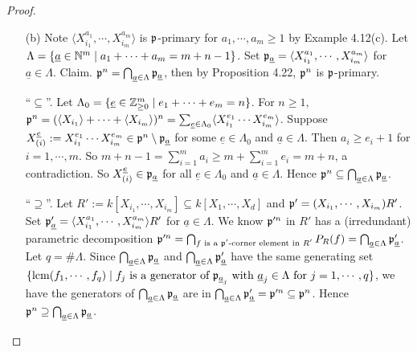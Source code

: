 \begin{proof}
    \begin{enumerate}
        \item[(b)]
            Note $\langle X_{i_1}^{a_1},\cdots,X_{i_m}^{a_m} \rangle$ is $\mathfrak{p}$-primary for $a_1,\cdots,a_m \geq 1$ by Example 4.12(c). Let $\Lambda = \{\underline a \in \mathbb{N}^{m} \mid a_1 + \cdots + a_m = m+n-1\}$. Set $\mathfrak{p}_{\underline a} = \langle X_{i_1}^{a_1},\cdots,X_{i_m}^{a_m} \rangle$ for $\underline a \in \Lambda$. Claim. $\mathfrak{p}^{n} = \bigcap_{\underline a \in \Lambda} \mathfrak{p}_{\underline a}$, then by Proposition 4.22, $\mathfrak{p}^{n}$ is $\mathfrak{p}$-primary. \par
            ``$\subseteq$''. Let $\Lambda_0 = \{\underline e \in \mathbb{Z}_{\geq 0}^{m} \mid e_1 + \cdots + e_m = n\}$. For $n \geq 1$, $\mathfrak{p}^{n} = (\langle X_{i_1} \rangle + \cdots + \langle X_{i_m} \rangle)^{n} = \sum_{\underline e \in \Lambda_0} \langle X_{i_1}^{e_1} \cdots X_{i_m}^{e_m} \rangle$. Suppose $X_{(i)}^{\underline e} := X_{i_1}^{e_1} \cdots X_{i_m}^{e_m} \in \mathfrak{p}^{n} \setminus \mathfrak{p}_{\underline a}$ for some $\underline e \in \Lambda_0$ and $\underline a \in \Lambda$. Then $a_i \geq e_i+1$ for $i = 1,\cdots,m$. So $m+n-1 = \sum_{i=1}^{m}a_i \geq m + \sum_{i=1}^{m}e_i = m+n$, a contradiction. So $X^{\underline e}_{(i)} \in \mathfrak{p}_{\underline a}$ for all $\underline e \in \Lambda_0$ and $\underline a \in \Lambda$. Hence $\mathfrak{p}^{n} \subseteq \bigcap_{\underline a \in \Lambda} \mathfrak{p}_{\underline a}$. \par 
            ``$\supseteq$''. Let $R' := k[X_{i_1},\cdots,X_{i_m}] \subseteq k[X_1,\cdots,X_d]$ and $\mathfrak{p}' = (X_{i_1},\cdots,X_{i_m})R'$. Set $\mathfrak{p}'_{\underline a} = \langle X_{i_1}^{a_1},\cdots,X_{i_m}^{a_m} \rangle R'$ for $\underline a \in \Lambda$. We know $\mathfrak{p}'^{n}$ in $R'$ has a (irredundant) parametric decomposition $\mathfrak{p}'^{n} = \bigcap_{f \text{ is a $\mathfrak{p}'$-corner element in $R'$}} P_R(f) = \bigcap_{\underline a \in \Lambda} \mathfrak{p}'_{\underline a}$. Let $q = \# \Lambda$. Since $\bigcap_{\underline a \in \Lambda} \mathfrak{p}_{\underline a}$ and $\bigcap_{\underline a \in \Lambda} \mathfrak{p}'_{\underline a}$ have the same generating set $\{\operatorname{lcm}(f_1,\cdots,f_q) \mid f_j \text{ is a generator of $\mathfrak{p}_{\underline a_j}$ with $\underline a_j \in \Lambda$ for $j=1,\cdots,q$}\}$, we have the generators of $\bigcap_{\underline a \in \Lambda} \mathfrak{p}_{\underline a}$ are in $\bigcap_{\underline a \in \Lambda} \mathfrak{p}_{\underline a}' = \mathfrak{p}'^{n} \subseteq \mathfrak{p}^{n}$. Hence $\mathfrak{p}^{n} \supseteq \bigcap_{\underline a \in \Lambda} \mathfrak{p}_{\underline a}$. \qedhere
    \end{enumerate}
\end{proof}

